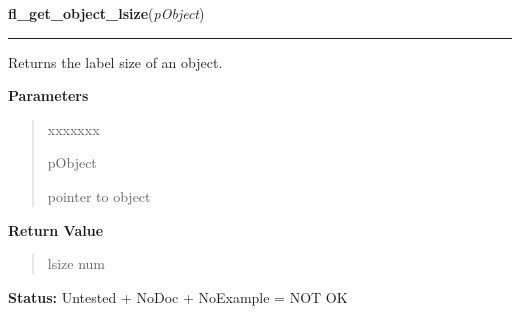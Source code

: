 \hspace{.8\funcindent}\begin{boxedminipage}{\funcwidth}

    \raggedright \textbf{fl\_get\_object\_lsize}(\textit{pObject})

    \vspace{-1.5ex}

    \rule{\textwidth}{0.5\fboxrule}
\setlength{\parskip}{2ex}
    Returns the label size of an object.

\setlength{\parskip}{1ex}
      \textbf{Parameters}
      \vspace{-1ex}

      \begin{quote}
        \begin{Ventry}{xxxxxxx}

          \item[pObject]

          pointer to object

        \end{Ventry}

      \end{quote}

      \textbf{Return Value}
    \vspace{-1ex}

      \begin{quote}
      lsize num

      \end{quote}

\textbf{Status:} Untested + NoDoc + NoExample = NOT OK



    \end{boxedminipage}

    \label{xformslib:library:fl_set_object_lstyle}

    \vspace{0.5ex}

